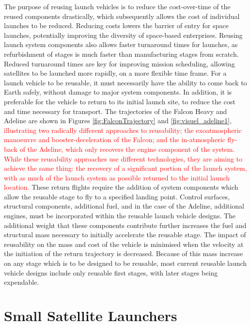     The purpose of reusing launch vehicles is to reduce the cost-over-time of the reused components drastically, which subsequently allows the cost of individual launches to be reduced\cite{RichardWebb2016}. Reducing costs lowers the barrier of entry for space launches, potentially improving the diversity of space-based enterprises. 
    Reusing launch system components also allows faster turnaround times for launches, as refurbishment of stages is much faster than manufacturing stages from scratch. Reduced turnaround times are key for improving mission scheduling, allowing satellites to be launched more rapidly, on a more flexible time frame. 
    For a launch vehicle to be reusable, it must necessarily have the ability to come back to Earth safely, without damage to major system components. In addition, it is preferable for the vehicle to return to its initial launch site, to reduce the cost and time necessary for transport. The trajectories of the Falcon Heavy and Adeline are shown in Figures \ref{fig:FalconTrajectory} and \ref{fig:visuel_adeline1}, \textcolor{red}{ illustrating two radically different approaches to reusability; the exoatmospheric manoeuvre and booster-deceleration of the Falcon; and the in-atmospheric fly-back of the Adeline, which only recovers the engine component of the system. While these reusability approaches use different technologies, they are aiming to achieve the same thing: the recovery of a significant portion of the launch system, with as much of the launch system as possible returned to the initial launch location.} These return flights require the addition of system components which allow the reusable stage to fly to a specified landing point. Control surfaces\cite{Clark2018}, structural components\cite{Sarigul2003}, additional fuel\cite{Sarigul2003}, and in the case of the Adeline, additional engines\cite{Adeline}, must be incorporated within the reusable launch vehicle designs. The additional weight that these components contribute further increases the fuel and structural mass necessary to initially accelerate the reusable stage. The impact of reusability on the mass and cost of the vehicle is minimised when the velocity at the initiation of the return trajectory is decreased. Because of this mass increase on any stage which is to be designed to be reusable, most current reusable launch vehicle designs include only reusable first stages, with later stages being expendable. 
    
    
    
    
    \section{Small Satellite Launchers}\label{subsec:smallsats}
    
